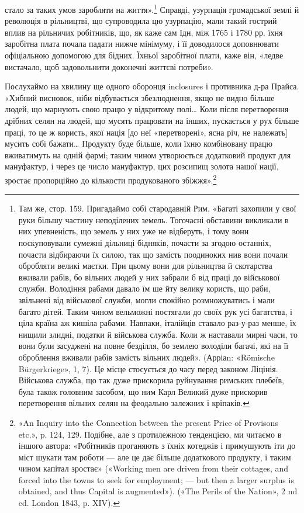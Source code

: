 стало за таких умов заробляти на життя».\footnote{
Там же, стор. 159. Пригадаймо собі стародавній Рим. «Багаті
захопили у свої руки більшу частину неподілених земель. Тогочасні
обставини викликали в них упевненість, що земель у них уже не відберуть,
і тому вони поскуповували сумежні дільниці бідняків, почасти за
згодою останніх, почасти відбираючи їх силою, так що замість поодиноких
нив вони почали обробляти великі маєтки. При цьому вони для
рільництва й скотарства вживали рабів, бо вільних людей у них забрали б
від праці до військової служби. Володіння рабами давало їм ше йту
велику користь, що раби, звільнені від військової служби, могли спокійно
розмножуватись і мали багато дітей. Таким чином вельможні постягали
до своїх рук усі багатства, і ціла країна аж кишіла рабами. Навпаки,
італійців ставало раз-у-раз менше, їх нищили злидні, податки й військова
служба. Коли ж наставали мирні часи, то вони були засуджені
на повне безділля, бо землею володіли багачі, які на її оброблення вживали
рабів замість вільних людей». (Арріаn: «Römische Bürgerkriege»,
1, 7). Це місце стосується до часу перед законом Ліцінія. Військова служба,
що так дуже прискорила руйнування римських плебеїв, була також
головним засобом, що ним Карл Великий дуже прискорив перетворення
вільних селян на феодально залежних і кріпаків.
} Справді, узурпація
громадської землі й революція в рільництві, що супроводила
цю узурпацію, мали такий гострий вплив на рільничих робітників,
що, як каже сам Ідн, між 1765 і 1780 рр. їхня заробітна
\parcont{}
плата почала падати нижче мінімуму, і її доводилося доповнювати
офіціальною допомогою для бідних. Їхньої заробітної плати,
каже він, «ледве вистачало, щоб задовольнити доконечні життєві
потреби».

Послухаймо на хвилину ще одного оборонця inclosures і противника
д-ра Прайса. «Хибний висновок, ніби відбувається
збезлюднення, якщо не видно більше людей, що марнують свою
працю у відкритому полі\dots{} Коли після перетворення дрібних
селян на людей, що мусять працювати на інших, пускається у
рух більше праці, то це ж користь, якої нація [до неї «перетворені»,
ясна річ, не належать] мусить собі бажати\dots{} Продукту
буде більше, коли їхню комбіновану працю вживатимуть на
одній фармі; таким чином утворюється додатковий продукт для
мануфактур, і через це число мануфактур, цих розсипищ золота
нашої нації, зростає пропорційно до кількости продукованого
збіжжя».\footnote{
«An Inquiry into the Connection between the present Price of
Provisons etc.», p. 124, 129. Подібне, але з протилежною тенденцією, ми
читаємо в іншого автора: «Робітників проганяють з їхніх котеджів і
примушують іти до міст шукати там роботи — але це дає більше додаткового
продукту, і таким чином капітал зростає» («Working men are driven
from their cottages, and forced into the towns to seek for employment; —
but then a larger surplus is obtained, and thus Capital is augmented»).
(«The Perils of the Nation», 2 nd ed. London 1843, p. XIV).
}

